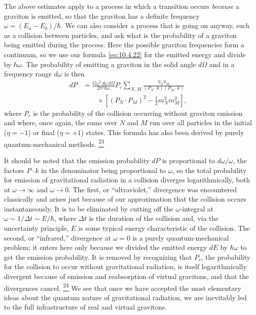 The above estimates apply to a process in which a transition occurs
\emph{because} a graviton is emitted, so that the graviton has a definite
frequency \(\omega=(E_a-E_b)/\hbar\). We can also consider a process that is
going on anyway, such as a collision between particles, and ask what is the
probability of a graviton being emitted during the process. Here the possible
graviton frequencies form a continuum, so we use our formula
\eqref{eq:10.4.22} for the emitted energy and divide by \(\hbar\omega\).
The probability of emitting a graviton in the solid angle \(d\Omega\) and in
a frequency range \(d\omega\) is then
\begin{equation}
  \begin{split}
  dP
  &=
  \frac{G\omega^2\,d\omega\,d\Omega}{2\pi^2\hbar\omega}
  P_c
  \sum_{N,M}
  \frac{\eta_N\eta_M}
       {(P_N\cdot k)(P_M\cdot k)}
  \\
  &\qquad\times
  \left[
    (P_N\cdot P_M)^2-\frac12m_N^2m_M^2
  \right],
  \end{split}
  \tag{10.8.8}\label{eq:10.8.8}
\end{equation}
where \(P_c\) is the probability of the collision occurring without graviton
emission and where, once again, the sums over \(N\) and \(M\) run over all
particles in the initial (\(\eta=-1\)) or final (\(\eta=+1\)) states.
This formula has also been derived by purely quantum-mechanical methods.%
\hyperref[ch10-ref-23]{\textsuperscript{23}}

It should be noted that the emission probability \(dP\) is proportional to
\(d\omega/\omega\), the factors \(P\cdot k\) in the denominator being
proportional to \(\omega\), so the total probability for emission of
gravitational radiation in a collision diverges logarithmically, both at
\(\omega\to\infty\) and \(\omega\to0\). The first, or ``ultraviolet,''
divergence was encountered classically and arises just because of our
approximation that the collision occurs instantaneously. It is to be
eliminated by cutting off the \(\omega\)-integral at
\(\omega\sim1/\Delta t\sim E/\hbar\), where \(\Delta t\) is the duration
of the collision and, via the uncertainty principle, \(E\) is some typical
energy characteristic of the collision. The second, or ``infrared,''
divergence at \(\omega=0\) is a purely quantum-mechanical problem; it enters
here only because we divided the emitted energy \(dE\) by \(\hbar\omega\)
to get the emission probability. It is removed by recognizing that \(P_c\),
the probability for the collision to occur without gravitational radiation,
is itself logarithmically divergent because of emission and reabsorption of
virtual gravitons, and that the divergences cancel.%
\hyperref[ch10-ref-24]{\textsuperscript{24}}
We see that once we have accepted the most elementary ideas about the quantum
nature of gravitational radiation, we are inevitably led to the full
infrastructure of real and virtual gravitons.

